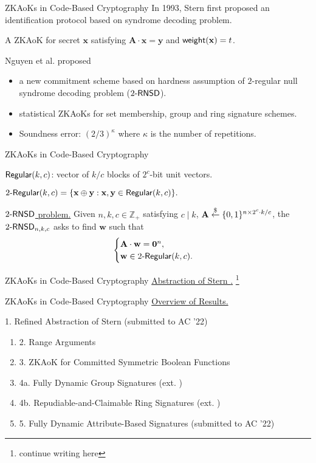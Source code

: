 \begin{frame}{ZKAoKs in Code-Based Cryptography}
	In 1993, Stern first proposed an identification protocol \cite{Stern93} based on syndrome decoding problem.\pause
	
	A ZKAoK for secret $\mathbf{x}$ satisfying $\mathbf{A}\cdot\mathbf{x} = \mathbf{y}$ and $\mathsf{weight}(\mathbf{x}) = t$. \pause
	
	Nguyen et al. \cite{NguyenTWZ19, NguyenTWZ19eprint} proposed \pause
	\begin{itemize}
		\item a new commitment scheme based on hardness assumption of $2$-regular null syndrome decoding problem (${2\textsf{-}\mathsf{RNSD}}$).\pause
		\item statistical ZKAoKs for set membership, group and ring signature schemes.\pause 
		\item Soundness error: $(2/3)^\kappa$ where $\kappa$ is the number of repetitions.
	\end{itemize}
\end{frame}

\begin{frame}{ZKAoKs in Code-Based Cryptography}
	
		$\mathsf{Regular}(k,c)$: vector of $k/c$ blocks of $2^c$-bit unit vectors.\pause
	
		$2\textsf{-}\mathsf{Regular}(k,c) = \{\mathbf{x}\oplus\mathbf{y}: \mathbf{x}, \mathbf{y} \in \mathsf{Regular}(k, c)\}.$\pause
	
		\underline{${2\textsf{-}\mathsf{RNSD}}$ problem.}  Given $n, k, c \in \mathbb{Z}_+$ satisfying $c \mid k$, $\mathbf{A}\stackrel{\$}{\leftarrow}\{0,1\}^{n\times 2^c\cdot k/c}$, the ${2\textsf{-}\mathsf{RNSD}}_{n,k,c}$ asks to find $\mathbf{w}$ such that \pause$$\begin{cases}
			\mathbf{A}\cdot \mathbf{w} = \mathbf{0}^{n},\\
			\mathbf{w}\in2\textsf{-}\mathsf{Regular}(k,c).
		\end{cases}$$
\end{frame}
\begin{frame}{ZKAoKs in Code-Based Cryptography}
	\underline{Abstraction of Stern \cite{NguyenTWZ19}.} \footnote{continue writing here}
\end{frame}

\begin{frame}{ZKAoKs in Code-Based Cryptography}
	\underline{Overview of Results.}\pause
	
	{\small 1. Refined Abstraction of Stern (submitted to AC '22)}\pause
	\begin{enumerate}[$\Rightarrow$]
		\item {\small 2. Range Arguments \cite{NguyenTWZ19}}\pause
		\item {\small 3. ZKAoK for Committed Symmetric Boolean Functions \cite{LingNPTW21}}\pause
		\item {\small 4a. Fully Dynamic Group Signatures (ext. \cite{NguyenTWZ19})}\pause
		\item {\small 4b. Repudiable-and-Claimable Ring Signatures (ext. \cite{NguyenTWZ19})}\pause
		\item {\small 5. Fully Dynamic Attribute-Based Signatures (submitted to AC '22)}
	\end{enumerate}
\end{frame}